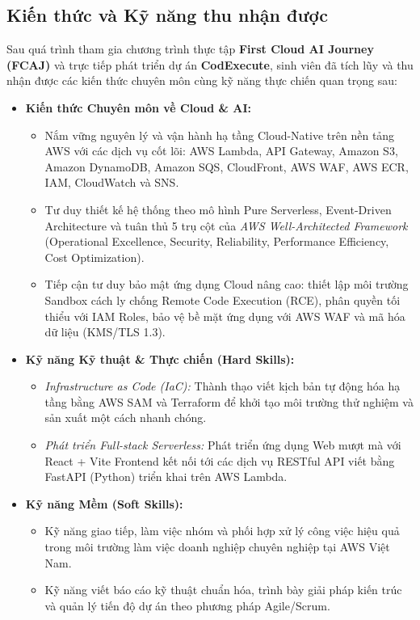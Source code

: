 \documentclass[a4paper]{article}
\theoremstyle{definition}
\begin{document}
\subsection{Kiến thức và Kỹ năng thu nhận được}

Sau quá trình tham gia chương trình thực tập \textbf{First Cloud AI Journey (FCAJ)} và trực tiếp phát triển dự án \textbf{CodExecute}, sinh viên đã tích lũy và thu nhận được các kiến thức chuyên môn cùng kỹ năng thực chiến quan trọng sau:

\begin{itemize}
    \item \textbf{Kiến thức Chuyên môn về Cloud \& AI:}
    \begin{itemize}
        \item Nắm vững nguyên lý và vận hành hạ tầng Cloud-Native trên nền tảng AWS với các dịch vụ cốt lõi: AWS Lambda, API Gateway, Amazon S3, Amazon DynamoDB, Amazon SQS, CloudFront, AWS WAF, AWS ECR, IAM, CloudWatch và SNS.
        \item Tư duy thiết kế hệ thống theo mô hình Pure Serverless, Event-Driven Architecture và tuân thủ 5 trụ cột của \textit{AWS Well-Architected Framework} (Operational Excellence, Security, Reliability, Performance Efficiency, Cost Optimization).
        \item Tiếp cận tư duy bảo mật ứng dụng Cloud nâng cao: thiết lập môi trường Sandbox cách ly chống Remote Code Execution (RCE), phân quyền tối thiểu với IAM Roles, bảo vệ bề mặt ứng dụng với AWS WAF và mã hóa dữ liệu (KMS/TLS 1.3).
    \end{itemize}

    \item \textbf{Kỹ năng Kỹ thuật \& Thực chiến (Hard Skills):}
    \begin{itemize}
        \item \textit{Infrastructure as Code (IaC):} Thành thạo viết kịch bản tự động hóa hạ tầng bằng AWS SAM và Terraform để khởi tạo môi trường thử nghiệm và sản xuất một cách nhanh chóng.
        \item \textit{Phát triển Full-stack Serverless:} Phát triển ứng dụng Web mượt mà với React + Vite Frontend kết nối tới các dịch vụ RESTful API viết bằng FastAPI (Python) triển khai trên AWS Lambda.
    \end{itemize}

    \item \textbf{Kỹ năng Mềm (Soft Skills):}
    \begin{itemize}
        \item Kỹ năng giao tiếp, làm việc nhóm và phối hợp xử lý công việc hiệu quả trong môi trường làm việc doanh nghiệp chuyên nghiệp tại AWS Việt Nam.
        \item Kỹ năng viết báo cáo kỹ thuật chuẩn hóa, trình bày giải pháp kiến trúc và quản lý tiến độ dự án theo phương pháp Agile/Scrum.
    \end{itemize}
\end{itemize}
\end{document}
